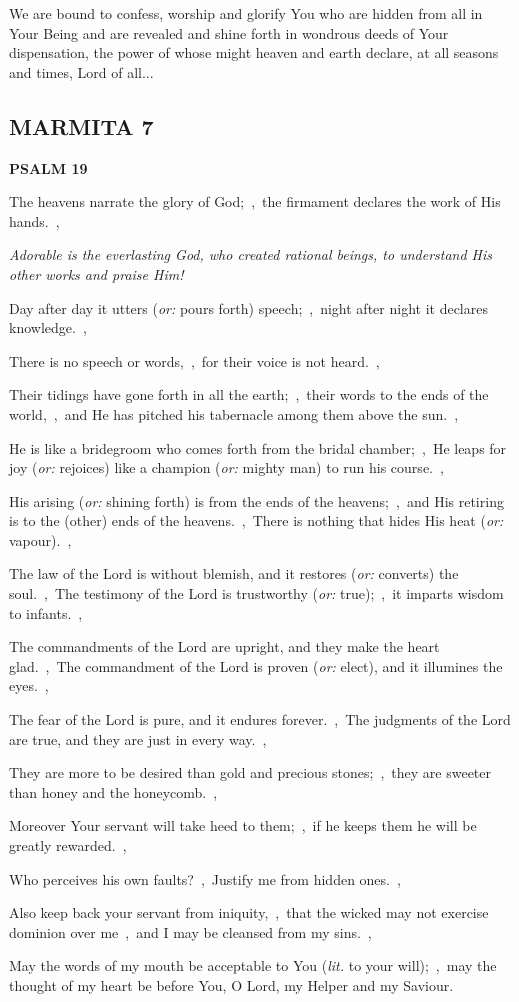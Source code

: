 \documentclass[12pt,twoside,a5paper]{article}
\newcommand{\marmita}[1]{\subsection*{MARMITA {#1}}}
\newcommand{\psalm}[1]{\textbf{PSALM {#1}}\nopagebreak}
\newcommand{\qanona}[1]{{\liturgicalhint{Qanona.} \emph{#1}}}
\newcommand{\slota}[1]{\liturgicalhint{Slota.} #1}
\newcommand{\translationoption}[1]{\emph{or:} #1}
\newcommand{\translationliteral}[1]{\emph{lit.} #1}
\begin{document}
\slota{We are bound to confess, worship and glorify You who are hidden from all in Your Being and are revealed and shine forth in wondrous deeds of Your dispensation, the power of whose might heaven and earth declare, at all seasons and times, Lord of all...}

\marmita{7}

\psalm{19}

\begin{normalparskip}
  The heavens narrate the glory of God;~\sep\ the firmament declares the work of His hands.~\sep

  \qanona{Adorable is the everlasting God, who created rational beings, to understand His other works and praise Him!}

  Day after day it utters (\translationoption{pours forth}) speech;~\sep\ night after night it declares knowledge.~\sep

  There is no speech or words,~\sep\ for their voice is not heard.~\sep

  Their tidings have gone forth in all the earth;~\sep\ their words to the ends of the world,~\sep\ and He has pitched his tabernacle among them above the sun.~\sep

  He is like a bridegroom who comes forth from the bridal chamber;~\sep\ He leaps for joy (\translationoption{rejoices}) like a champion (\translationoption{mighty man}) to run his course.~\sep

  His arising (\translationoption{shining forth}) is from the ends of the heavens;~\sep\ and His retiring is to the (other) ends of the heavens.~\sep\ There is nothing that hides His heat (\translationoption{vapour}).~\sep

  The law of the Lord is without blemish, and it restores (\translationoption{converts}) the soul.~\sep\ The testimony of the Lord is trustworthy (\translationoption{true});~\sep\ it imparts wisdom to infants.~\sep

  The commandments of the Lord are upright, and they make the heart glad.~\sep\ The commandment of the Lord is proven (\translationoption{elect}), and it illumines the eyes.~\sep

  The fear of the Lord is pure, and it endures forever.~\sep\ The judgments of the Lord are true, and they are just in every way.~\sep

  They are more to be desired than gold and precious stones;~\sep\ they are sweeter than honey and the honeycomb.~\sep

  Moreover Your servant will take heed to them;~\sep\ if he keeps them he will be greatly rewarded.~\sep

  Who perceives his own faults?~\sep\ Justify me from hidden ones.~\sep

  Also keep back your servant from iniquity,~\sep\ that the wicked may not exercise dominion over me~\sep\ and I may be cleansed from my sins.~\sep

  May the words of my mouth be acceptable to You (\translationliteral{to your will});~\sep\ may the thought of my heart be before You, O Lord, my Helper and my Saviour.
\end{normalparskip}
\end{document}
